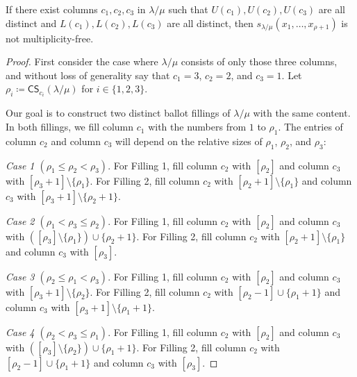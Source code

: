 \documentclass[ALCO,ThmDefs,Unicode,epreuves]{cedram}
\newcommand{\CS	}{\mathsf{CS}}
\let\hypertargeta\hypertarget %
\newenvironment{Case}[1]{\par\vskip2pt\noindent%
\emph{#1}.}{\vskip2pt}
\begin{document}
\begin{prop}
\label{prop:3col}
If there exist columns $c_1,c_2,c_3$ in $\lambda/\mu$ such that $U(c_1),U(c_2),U(c_3)$ are all distinct and $L(c_1),L(c_2),L(c_3)$ are all distinct, then $s_{\lambda/\mu}(x_1,\ldots,x_{\rho+1})$ is not multiplicity-free.
\end{prop}
\begin{proof}


First consider the case where $\lambda/\mu$ consists of only those three columns, and without loss of generality say that $c_1=3$, $c_2=2$, and $c_3=1$. Let $\rho_i \coloneqq \CS _{c_i}(\lambda/\mu)$ for $i \in \{1,2,3\}$.

Our goal is to construct two distinct ballot fillings of $\lambda/\mu$ with the same content. In both fillings, we fill column $c_1$ with the numbers from $1$ to $\rho_1$. The entries of column $c_2$ and column $c_3$ will depend on the relative sizes of $\rho_1$, $\rho_2$, and $\rho_3$:


\begin{Case}
{\hypertargeta{prop3.5case_1}{Case 1} $(\rho_1\leq \rho_2 < \rho_3)$} 
For Filling 1, fill column $c_2$ with $[\rho_2]$ and column $c_3$ with $[\rho_3+1]\setminus \{\rho_1\}$. For Filling 2, fill column $c_2$ with $[\rho_2+1]\setminus \{\rho_1\}$ and column $c_3$ with $[\rho_3+1]\setminus \{\rho_2+1\}$.
\end{Case}

\begin{Case}
{\hypertargeta{prop3.5case_2}{Case 2} $(\rho_1< \rho_3 \leq \rho_2)$} 
For Filling 1, fill column $c_2$ with $[\rho_2]$ and column $c_3$ with $([\rho_3]\setminus \{\rho_1\})\cup \{\rho_2+1\}$. For Filling 2, fill column $c_2$ with $[\rho_2+1]\setminus \{\rho_1\}$ and column $c_3$ with $[ \rho_3]$.
\end{Case}

\begin{Case}
{\hypertargeta{prop3.5case_3}{Case 3} $(\rho_2\leq \rho_1 < \rho_3)$} 
For Filling 1, fill column $c_2$ with $[\rho_2]$ and column $c_3$ with $[\rho_3+1]\setminus \{\rho_2\}$. For Filling 2, fill column $c_2$ with $[\rho_2-1]\cup\{\rho_1+1\}$ and column $c_3$ with $[\rho_3+1]\setminus\{\rho_1+1\}$.
\end{Case}

\begin{Case}
{\hypertargeta{prop3.5case_4}{Case 4} $(\rho_2< \rho_3 \leq \rho_1)$} For Filling 1, fill column $c_2$ with $[\rho_2]$ and column $c_3$ with $([\rho_3]\setminus \{\rho_2\})\cup \{\rho_1+1\}$. For Filling 2, fill column $c_2$ with $[\rho_2-1]\cup\{\rho_1+1\}$ and column $c_3$ with $[\rho_3]$.
\end{Case}


\end{proof}
\end{document}
